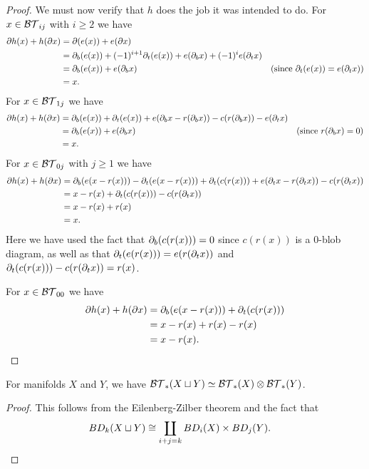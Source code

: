 \begin{proof}
We must now verify that $h$ does the job it was intended to do.
For $x\in {\mathcal{BT}}_{ij}$ with $i\ge 2$ we have
\begin{align*}
	\partial h(x) + h(\partial x) &= \partial(e(x)) + e(\partial x) && \\
			&= \partial_b(e(x)) + (-1)^{i+1} \partial_t(e(x)) + e(\partial_b x) + (-1)^i e(\partial_t x) && \\
			&= \partial_b(e(x)) + e(\partial_b x) && \text{(since $\partial_t(e(x)) = e(\partial_t x)$)} \\
		 	&= x . &&
\end{align*}
For $x\in {\mathcal{BT}}_{1j}$ we have
\begin{align*}
	\partial h(x) + h(\partial x) &= \partial_b(e(x)) + \partial_t(e(x)) + e(\partial_b x - r(\partial_b x)) - c(r(\partial_b x)) - e(\partial_t x) && \\
			&= \partial_b(e(x)) + e(\partial_b x) && \text{(since $r(\partial_b x) = 0$)} \\
			&= x . &&
\end{align*}
For $x\in {\mathcal{BT}}_{0j}$ with $j\ge 1$ we have
\begin{align*}
	\partial h(x) + h(\partial x) &= \partial_b(e(x - r(x))) - \partial_t(e(x - r(x))) + \partial_t(c(r(x))) + 
											e(\partial_t x - r(\partial_t x)) - c(r(\partial_t x)) \\
			&= x - r(x) + \partial_t(c(r(x))) - c(r(\partial_t x)) \\
			&= x - r(x) + r(x) \\
			&= x.
\end{align*}
Here we have used the fact that $\partial_b(c(r(x))) = 0$ since $c(r(x))$ is a $0$-blob diagram, 
as well as that $\partial_t(e(r(x))) = e(r(\partial_t x))$
and $\partial_t(c(r(x))) - c(r(\partial_t x))  = r(x)$.

For $x\in {\mathcal{BT}}_{00}$ we have
\begin{align*}
	\partial h(x) + h(\partial x) &= \partial_b(e(x - r(x))) + \partial_t(c(r(x))) \\
			&= x - r(x) + r(x) - r(x)\\
			&= x - r(x). \qedhere
\end{align*}
\end{proof}

\begin{lemma} \label{btc-prod}
For manifolds $X$ and $Y$, we have ${\mathcal{BT}}_*(X\sqcup Y) \simeq {\mathcal{BT}}_*(X)\otimes{\mathcal{BT}}_*(Y)$.
\end{lemma}
\begin{proof}
This follows from the Eilenberg-Zilber theorem and the fact that
\begin{align*}
	BD_k(X\sqcup Y) & \cong \coprod_{i+j=k} BD_i(X)\times BD_j(Y) . \qedhere
\end{align*}
\end{proof}

